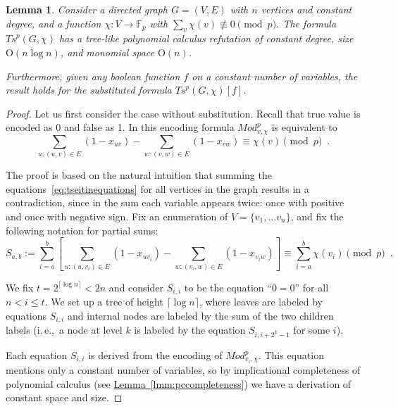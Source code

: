 \documentclass[11pt]{article}
\numberwithin{equation}{section}
\newtheorem{lemma}[theorem]{Lemma}
\theoremstyle{definition}
\theoremstyle{plain}
\newcommand{\ie}{i.\,e.}
\newcommand{\expref}[2]{\hyperref[#2]{#1~\ref{#2}}}
\theoremstyle{plain}
\theoremstyle{definition}
\newcommand{\bigoh}[1]{\mathrm{O} ( #1 )}
\newcommand{\fieldstd}{\mathbb{F}}
\newcommand{\funcdescr}[3]{\ensuremath{ #1 : #2 \to #3}}
\newcommand{\eqperiod}{\enspace .}
\newcommand{\ieComma}{\ie,\ }
\newcommand{\formulaformat}[1]{\mathit{#1}}
\newcommand{\substform}[2]{{#1}[{#2}]}
\newcommand{\tseitinmodpnot}[2]{\formulaformat{Ts}^{p}({#1,#2})}
\newcommand{\tseitinmodpflow}[2]{\ensuremath{\formulaformat{Mod}^{p}_{#1,#2}}}
\newcommand{\tseitincharge}{\chi}
\begin{document}
\begin{lemma}\label{lmm:tseitinupperbound}
  Consider a directed graph $G=(V,E)$ with $n$ vertices and constant
  degree, and a function
  \mbox{$\funcdescr{\tseitincharge}{V}{\fieldstd_p}$}
  with
  $\sum_{v}\tseitincharge(v)\not\equiv 0 \pmod{p}$. The formula
  $\tseitinmodpnot{G}{\tseitincharge}$ has a tree-like polynomial calculus
  refutation of constant degree, size $\bigoh{n\log n}$, and monomial
  space $\bigoh{n}$.

  Furthermore, given any boolean function $f$ on a constant number of
  variables, the result holds for the substituted formula
  $\substform{\tseitinmodpnot{G}{\tseitincharge}}{f}$.
\end{lemma}

\begin{proof}
Let us first consider the case without substitution. Recall that true value is encoded as $0$ and false as 1. In this encoding formula $\tseitinmodpflow{v}{\tseitincharge}$ is equivalent to
  \begin{equation}\label{eq:tseitinequations}
    \sum_{u\colon(u,v)\in E} (1-x_{uv}) - \sum_{w\colon(v,w)\in E} (1-x_{vw})
    \equiv \tseitincharge(v) \pmod{p} \eqperiod
  \end{equation}

  The proof is based on the natural intuition that summing the
  equations~\eqref{eq:tseitinequations} for all vertices in the graph
  results in a contradiction, since in the sum each variable appears
  twice: once with positive and once with negative sign.
  Fix an enumeration of $V=\{v_{1},\ldots
  v_{n}\}$, and fix the following notation for partial sums:
  \begin{equation}
    S_{a,b}:=
    \sum^{b}_{i=a}
    \left[\sum_{u:(u,v_{i})\in E} (1-x_{uv_{i}})
    -
    \sum_{w:(v_{i},w)\in E} (1-x_{v_{i}w})\right]
    \equiv
    \sum^{b}_{i=a} \tseitincharge(v_{i}) \pmod{p} \eqperiod
  \end{equation}
  
  
  We fix $t=2^{\lceil \log n \rceil} < 2n$ and consider $S_{i,i}$ to
  be the equation ``$0=0$'' for all $n < i \leq t$.
  We set up a tree of height $\lceil \log n \rceil$, where leaves are
  labeled by equations $S_{i,i}$ and internal nodes are labeled by the
  sum of the two children labels (\ieComma a node at level $k$ is labeled
  by the equation $S_{i,i+2^{k}-1}$ for some $i$).

  Each equation $S_{i,i}$ is derived from the encoding of
  $\tseitinmodpflow{v_{i}}{\tseitincharge}$. This equation mentions only a constant
  number of variables, so by implicational completeness of polynomial
  calculus (see \expref{Lemma}{lmm:pccompleteness}) we have a derivation
  of constant space and size.


\end{proof}
\end{document}
